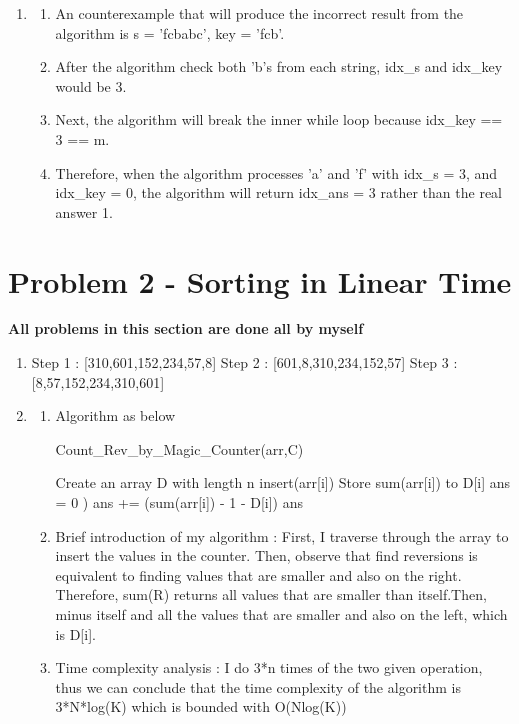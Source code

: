 \documentclass{article}
\begin{document}
\begin{CJK*}{UTF8}{bsmi}
\begin{enumerate}
\begin{enumerate}
\begin{enumerate}
        \end{enumerate}
    \end{enumerate}
    \item 
    \begin{enumerate}
        \item An counterexample that will produce the incorrect result from the algorithm is s = 'fcbabc', key = 'fcb'.
        \item After the algorithm check both 'b's from each string, idx\_s and idx\_key would be 3.
        \item Next, the algorithm will break the inner while loop because idx\_key == 3 == m. 
        \item Therefore, when the algorithm processes 'a' and 'f' with idx\_s = 3, and idx\_key = 0, the algorithm will return idx\_ans = 3 rather than the real answer 1.
    \end{enumerate}

\end{enumerate}

\section{Problem 2 - Sorting in Linear Time}
\textbf{All problems in this section are done all by myself}
\begin{enumerate}
    \item Step 1 : [310,601,152,234,57,8]
          Step 2 : [601,8,310,234,152,57]
          Step 3 : [8,57,152,234,310,601]

    \item  
    \begin{enumerate}
        \item Algorithm as below
        \begin{algorithm}[H]
        \caption{Count\_Rev\_by\_Magic\_Counter(arr,C)}
        \begin{algorithmic}
        \State Create an array D with length n
            \State insert(arr[i])
            \State Store sum(arr[i]) to D[i]
        \EndFor
        \State ans = 0
        )
            \State ans += (sum(arr[i]) - 1 - D[i])
        \EndFor
        \State \Return ans
        \end{algorithmic}
        \end{algorithm}
        \item Brief introduction of my algorithm : First, I traverse through the array to insert the values in the counter. Then, observe that find reversions is equivalent to finding values that are smaller and also on the right. Therefore, sum(R) returns all values that are smaller than itself.Then, minus itself and all the values that are smaller and also on the left, which is D[i].
        \item Time complexity analysis : I do 3*n times of the two given operation, thus we can conclude that the time complexity of the algorithm is 3*N*log(K) which is bounded with O(Nlog(K))
    \end{enumerate}
 

\end{enumerate}
\end{CJK*}
\end{document}
